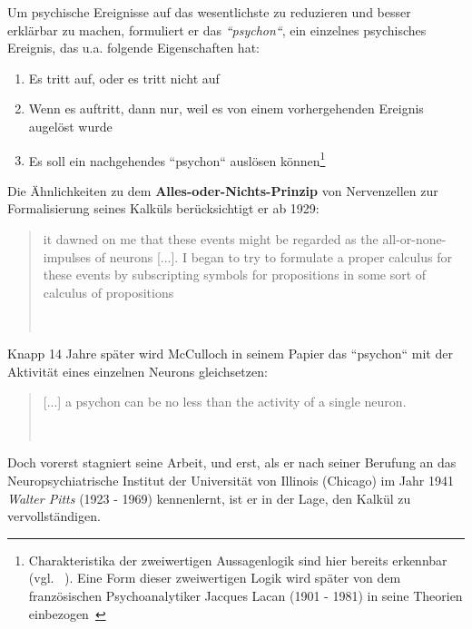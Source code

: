 Um psychische Ereignisse auf das wesentlichste zu reduzieren und besser erklärbar zu machen, formuliert er das \textit{``psychon``}, ein einzelnes psychisches Ereignis, das u.a. folgende Eigenschaften hat:

\begin{enumerate}
    \item Es tritt auf, oder es tritt nicht auf
    \item Wenn es auftritt, dann nur, weil es von einem vorhergehenden Ereignis augelöst wurde
    \item Es soll ein nachgehendes ``psychon`` auslösen können\footnote{
        Charakteristika der zweiwertigen Aussagenlogik sind hier bereits erkennbar (vgl. ~\cite[7]{Abr02}). Eine Form dieser zweiwertigen Logik wird später von dem französischen Psychoanalytiker Jacques Lacan (1901 - 1981) in seine Theorien einbezogen~\cite[317]{Liu10}
    }
\end{enumerate}


Die Ähnlichkeiten zu dem \textbf{Alles-oder-Nichts-Prinzip} von Nervenzellen zur Formalisierung seines Kalküls berücksichtigt er ab 1929:

\blockquote[{~\cite[6]{Mcc16}}]{
    it dawned on me that these events might be regarded as the all-or-none-impulses of neurons [...]. I began to try to formulate a proper calculus for these events by subscripting symbols for propositions in some sort of calculus of propositions
}

Knapp 14 Jahre später wird McCulloch in seinem Papier das ``psychon`` mit der Aktivität eines einzelnen Neurons gleichsetzen:

\blockquote[{~\cite[114]{MP43}}]{
    [...] a psychon can be no less than the activity of a single neuron.
}

Doch vorerst stagniert seine Arbeit, und erst, als er nach seiner Berufung an das Neuropsychiatrische Institut der Universität von Illinois (Chicago) im Jahr 1941 \textit{Walter Pitts} (1923 - 1969) kennenlernt, ist er in der Lage, den Kalkül zu vervollständigen.\\

